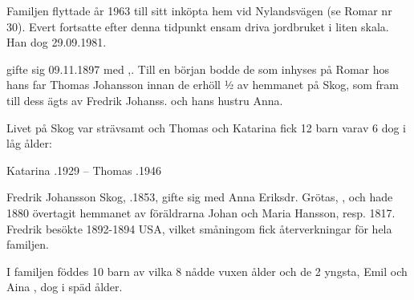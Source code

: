Familjen flyttade år 1963 till sitt inköpta hem vid Nylandsvägen (se Romar nr 30). Evert fortsatte efter denna tidpunkt ensam driva jordbruket i liten skala. Han dog 29.09.1981.


 gifte sig 09.11.1897 med ,. Till en början bodde de som inhyses på Romar hos hans far Thomas Johansson innan de erhöll ½ av hemmanet på Skog, som fram till dess ägts av Fredrik Johanss. och hans hustru Anna.

Livet på Skog var strävsamt och Thomas och Katarina fick 12 barn varav 6 dog i låg ålder:
\begin{jhchildren}
  \item {}
  \item {}
  \item {}
  \item {}
  \item {}
  \item {}
  \item {}
  \item {}
  \item {}
  \item {}
  \item {}
  \item {}
\end{jhchildren}

Katarina .1929 -- Thomas .1946

Fredrik Johansson Skog, .1853, gifte sig med Anna Eriksdr. Grötas,  , och hade 1880 övertagit hemmanet av föräldrarna Johan och Maria Hansson,  resp. 1817. Fredrik besökte 1892-1894 USA, vilket småningom fick återverkningar för hela familjen.

I familjen föddes 10 barn av vilka 8 nådde vuxen ålder och de 2 yngsta, Emil  och Aina , dog i späd ålder.
\begin{jhchildren}
  \item {}
  \item {}
  \item {}
  \item {}
  \item {}
  \item {}
  \item {}
  \item {}
\end{jhchildren}

